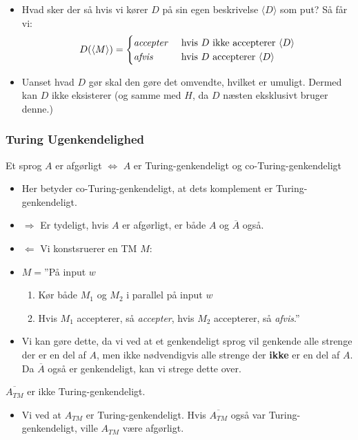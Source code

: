 \begin{frame}[allowframebreaks]
\begin{itemize}
		\item Hvad sker der så hvis vi kører $D$ på sin egen beskrivelse $\langle D \rangle $ som put? Så får vi:
		      \begin{equation*}
			      D(\langle M \rangle ) = \begin{cases}
				      \text{\textit{accepter}} & \text{ hvis }D \text{ ikke accepterer } \langle D \rangle \\
				      \text{\textit{afvis}}    & \text{ hvis }D \text{ accepterer } \langle D \rangle
			      \end{cases}
		      \end{equation*}
		\item Uanset hvad $D$ gør skal den gøre det omvendte, hvilket er umuligt. Dermed kan $D$ ikke eksisterer (og samme med $H$, da $D$ næsten eksklusivt bruger denne.)
	\end{itemize}
\end{frame}


\begin{frame}[allowframebreaks]
	\frametitle{Turing Ugenkendelighed}
	\begin{theorem}
		Et sprog $A$ er afgørligt $\iff$ $A$ er Turing-genkendeligt og co-Turing-genkendeligt
	\end{theorem}
	\begin{itemize}
		\item Her betyder co-Turing-genkendeligt, at dets komplement er Turing-genkendeligt.
		\item \(\Rightarrow\) Er tydeligt, hvis $A$ er afgørligt, er både $A$ og $\overline{A}$ også.
		\item \(\Leftarrow\) Vi konstsruerer en TM $M$:
		\item $M = $''På input $w$
		      \begin{enumerate}
			      \item Kør både $M_{1}$ og $M_{2}$ i parallel på input $w$
			      \item Hvis $M_{1}$ accepterer, så \textit{accepter}, hvis $M_{2}$ accepterer, så \textit{afvis}.''
		      \end{enumerate}
		\item Vi kan gøre dette, da vi ved at et genkendeligt sprog vil genkende alle strenge der er en del af $A$, men ikke nødvendigvis alle strenge der \textbf{ikke} er en del af $A$. Da $\overline{A}$ også er genkendeligt, kan vi strege dette over.
	\end{itemize}

	\begin{corollary}
		$\overline{A_{TM}}$ er ikke Turing-genkendeligt.
	\end{corollary}

	\begin{itemize}
		\item Vi ved at $A_{TM}$ er Turing-genkendeligt. Hvis $\overline{A_{TM}}$ også var Turing-genkendeligt, ville $A_{TM}$ være afgørligt.
	\end{itemize}
\end{frame}


